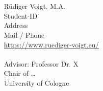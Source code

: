 % 
\begin{titlepage}
{\let\newpage\relax\maketitle}
\ \\
\vfill %
%
\ \\
\foreignlanguage{ngerman}{Rüdiger Voigt, M.A.}\\
Student-ID\\
Address\\
Mail / Phone\\
\url{https://www.ruediger-voigt.eu/}\\
\ \\
Advisor: \foreignlanguage{ngerman}{Professor Dr. X}\\
Chair of \dots\\
University of Cologne\\
\end{titlepage}
